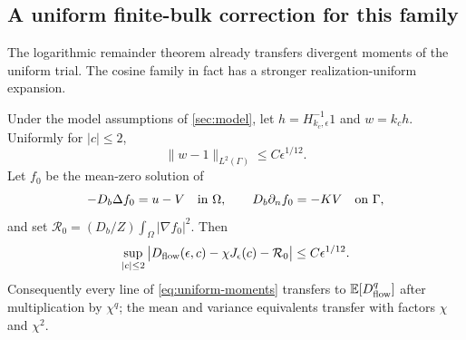 \subsection{A uniform finite-bulk correction for this family}
The logarithmic remainder theorem already transfers divergent moments
of the uniform trial. The cosine family in fact has a stronger
realization-uniform expansion.
\begin{proposition}
\label{prop:uniform-bulk-limit}
Under the model assumptions of \cref{sec:model}, let
$h=H_{k_c,\epsilon}^{-1}1$ and $w=k_ch$. Uniformly for $|c|\le2$,
\begin{equation}\label{eq:uniform-flux}
 \|w-1\|_{L^2(\Gamma)}\le C\epsilon^{1/12}.
\end{equation}
Let $f_0$ be the mean-zero solution of
\begin{equation}\label{eq:regular-bulk-problem}
 -D_b\Delta f_0=u-V\quad\hbox{in }\Omega,\qquad
 D_b\partial_n f_0=-KV\quad\hbox{on }\Gamma,
\end{equation}
and set $\mathcal R_0=(D_b/Z)\int_\Omega|\nabla f_0|^2$.
Then
\begin{equation}\label{eq:uniform-bulk-expansion}
 \sup_{|c|\le2}\big|D_{\mathrm{flow}}(\epsilon,c)-\chi J_\epsilon(c)
                                     -\mathcal R_0\big|
 \le C\epsilon^{1/12}.
\end{equation}
Consequently every line of \eqref{eq:uniform-moments} transfers to
$\mathbb E[D_{\mathrm{flow}}^q]$ after multiplication by $\chi^q$; the mean and
variance equivalents transfer with factors $\chi$ and $\chi^2$.
\end{proposition}
